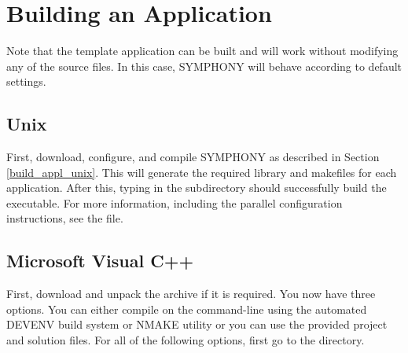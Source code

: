 
\section{Building an Application}
\label{building_custom_app}

Note that the template application can be built and will work without
modifying any of the source files. In this case, SYMPHONY will behave
according to default settings. 

\subsection{Unix}

First, download, configure, and compile SYMPHONY as described in Section
\ref{build_appl_unix}. This will generate the required library and makefiles
for each application. After this, typing  in the
 subdirectory should successfully build the
executable. For more information, including the parallel configuration
instructions, see the  file.

\subsection{Microsoft Visual C++}

First, download  and unpack the archive if it is
required. You now have three options. You can either compile on the
command-line using the automated DEVENV build system or NMAKE utility or you
can use the provided project and solution files. For all of the following
options, first go to the  directory.

